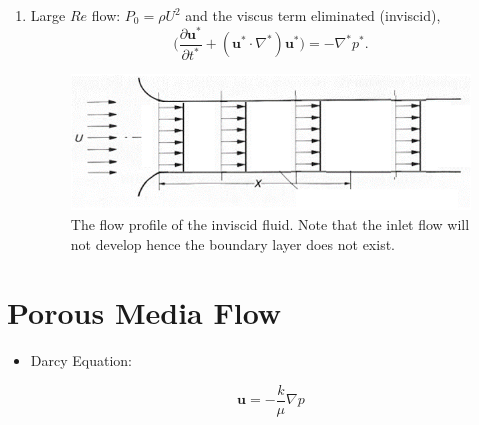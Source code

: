 \documentclass[a4paper]{article}
\begin{document}
\begin{itemize}
\begin{enumerate}
        \item {\color{red}Large $Re$ flow}: $P_0 = \rho U^2$ and the viscus term eliminated (inviscid),
        \[
            \bigg(\frac{\partial \mathbf{u^{*}}}{\partial t^{*}} + (\mathbf{u^{*}}\cdot \nabla^{*})\mathbf{u^{*}} \bigg) = -\nabla^{*} p^{*}.
        \]
        \vspace{-.6cm}
        \begin{figure}[H]
            \centering
            \includegraphics[width=.5\textwidth]{img/inviscid.png}
            \caption{The flow profile of the inviscid fluid. Note that the inlet flow will not develop hence the boundary layer does not exist.}
        \end{figure}
     \end{enumerate}
     
    
\end{itemize}



\section{Porous Media Flow}
\begin{itemize}
 \item Darcy Equation:\\
 \begin{minipage}{0.5\textwidth}
 \[\mathbf{u} = -\frac{k}{\mu} \nabla p\]
 \end{minipage}
 \begin{minipage}{0.4\textwidth}
    \begin{itemize}
    \end{itemize}
 \end{minipage}
\end{itemize}
\end{document}
